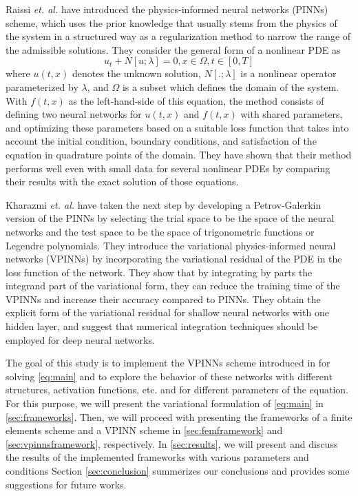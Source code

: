 Raissi \textit{et. al.} \cite{RAISSI2019686} have introduced the physics-informed neural networks (PINNs) scheme, which uses the prior knowledge that usually stems from the physics of the system in a structured way as a regularization method to narrow the range of the admissible solutions. They consider the general form of a nonlinear PDE as
\begin{equation}
    u_t + N[u; \lambda] = 0, x \in \Omega, t \in [0, T]
\end{equation}
where $u(t, x)$ denotes the unknown solution, $N[.; \lambda]$ is a nonlinear operator parameterized by $\lambda$, and $\Omega$ is a subset which defines the domain of the system. With $f(t, x)$ as the left-hand-side of this equation, the method consists of defining two neural networks for $u(t, x)$ and $f(t, x)$ with shared parameters, and optimizing these parameters based on a suitable loss function that takes into account the initial condition, boundary conditions, and satisfaction of the equation in quadrature points of the domain. They have shown that their method performs well even with small data for several nonlinear PDEs by comparing their results with the exact solution of those equations.

Kharazmi \textit{et. al.} \cite{kharazmi2019variational} have taken the next step by developing a Petrov-Galerkin version of the PINNs by selecting the trial space to be the space of the neural networks and the test space to be the space of trigonometric functions or Legendre polynomials. They introduce the variational physics-informed neural networks (VPINNs) by incorporating the variational residual of the PDE in the loss function of the network. They show that by integrating by parts the integrand part of the variational form, they can reduce the training time of the VPINNs and increase their accuracy compared to PINNs. They obtain the explicit form of the variational residual for shallow neural networks with one hidden layer, and suggest that numerical integration techniques should be employed for deep neural
networks.

The goal of this study is to implement the VPINNs scheme introduced in \cite{kharazmi2019variational} for solving \autoref{eq:main} and to explore the behavior of these networks with different structures, activation functions, etc. and for different parameters of the equation. For this purpose, we will present the variational formulation of \autoref{eq:main} in \autoref{sec:frameworks}. Then, we will proceed with presenting the frameworks of a finite elements scheme and a VPINN scheme in \autoref{sec:femframework} and \autoref{sec:vpinnsframework}, respectively. In \autoref{sec:results}, we will present and discuss the results of the implemented frameworks with various parameters and conditions Section \ref{sec:conclusion} summerizes our conclusions and provides some suggestions for future works.

